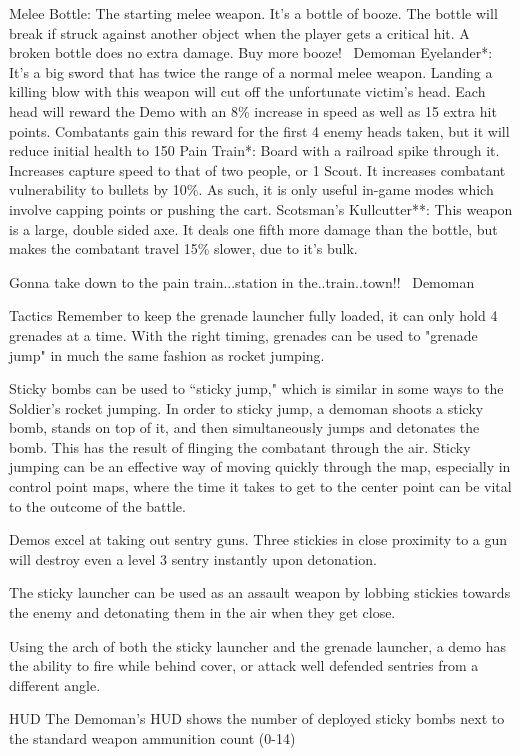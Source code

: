 Melee
Bottle: The starting melee weapon. It's a bottle of booze. The bottle will break if struck against another object when the player gets a critical hit. A broken bottle does no extra damage.
Buy more booze! ~Demoman
Eyelander*: It's a big sword that has twice the range of a normal melee weapon. Landing a killing blow with this weapon will cut off the unfortunate victim's head. Each head will reward the Demo with an 8\% increase in speed as well as 15 extra hit points. Combatants gain this reward for the first 4 enemy heads taken, but it will reduce initial health to 150
Pain Train*: Board with a railroad spike through it. Increases capture speed to that of two people, or 1 Scout. It increases combatant vulnerability to bullets by 10\%. As such, it is only useful in-game modes which involve capping points or pushing the cart.
Scotsman's Kullcutter**: This weapon is a large, double sided axe.  It deals one fifth more damage than the bottle, but makes the combatant travel 15\% slower, due to it's bulk.

Gonna take down to the pain train...station in the..train..town!! ~Demoman

Tactics
Remember to keep the grenade launcher fully loaded, it can only hold 4 grenades at a time.  With the right timing, grenades can be used to "grenade jump" in much the same fashion as rocket jumping.

Sticky bombs can be used to “sticky jump," which is similar in some ways to the Soldier's rocket jumping.  In order to sticky jump, a demoman shoots a sticky bomb, stands on top of it, and then simultaneously jumps and detonates the bomb. This has the result of flinging the combatant through the air.  Sticky jumping can be an effective way of moving quickly through the map, especially in control point maps, where the time it takes to get to the center point can be vital to the outcome of the battle.

Demos excel at taking out sentry guns. Three stickies in close proximity to a gun will destroy even a level 3 sentry instantly upon detonation.

The sticky launcher can be used as an assault weapon by lobbing stickies towards the enemy and detonating them in the air when they get close.

Using the arch of both the sticky launcher and the grenade launcher, a demo has the ability to fire while behind cover, or attack well defended sentries from a different angle.

HUD
The Demoman's HUD shows the number of deployed sticky bombs next to the standard weapon ammunition count (0-14)